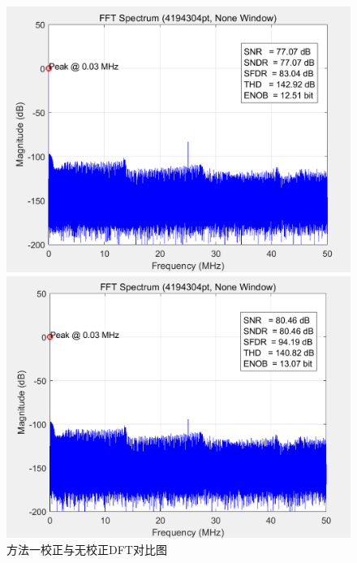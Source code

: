 \documentclass[cs4size,a4paper]{ctexart}
\numberwithin{equation}{section}
\numberwithin{table}{section}
\numberwithin{figure}{section}
\begin{document}
			\begin{figure}[H]
				\centering
				\begin{minipage}{0.49\linewidth}
					\centering
					\includegraphics[width=0.9\linewidth]{figure/MAD_FFT1.png}
				\end{minipage}
				\begin{minipage}{0.49\linewidth}
					\centering
					\includegraphics[width=0.9\linewidth]{figure/MAD_FFT2.png}
				\end{minipage}
				\caption{方法一校正与无校正DFT对比图} 
			\end{figure}
\end{document}
